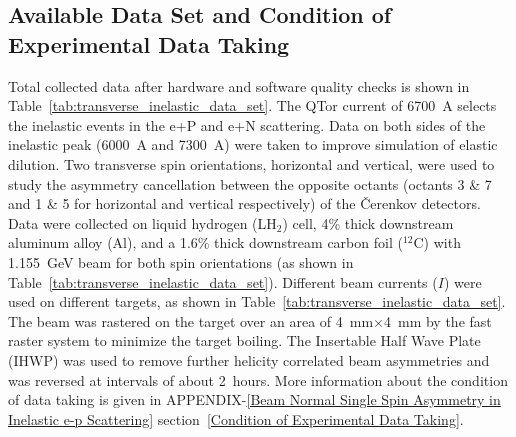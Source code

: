 \subsection{Available Data Set and Condition of Experimental Data Taking}
\label{Available Data Set and Condition of Experimental Data Taking}

Total collected data after hardware and software quality checks is shown in Table~\ref{tab:transverse_inelastic_data_set}. The QTor current of 6700~A selects the inelastic events in the e+P and e+N scattering. Data on both sides of the inelastic peak (6000~A and 7300~A) were taken to improve simulation of elastic dilution. Two transverse spin orientations, horizontal and vertical, were used to study the asymmetry cancellation between the opposite octants (octants 3 \& 7 and 1 \& 5 for horizontal and vertical respectively) of the \v{C}erenkov detectors. Data were collected on liquid hydrogen (LH$_{2}$) cell, 4\% thick downstream aluminum alloy (Al), and a 1.6\% thick downstream carbon foil ($^{12}$C) with 1.155~GeV beam for both spin orientations (as shown in Table~\ref{tab:transverse_inelastic_data_set}). 
Different beam currents ($I$) were used on different targets, as shown in Table~\ref{tab:transverse_inelastic_data_set}.
The beam was rastered on the target over an area of 4~mm$\times$4~mm by the fast raster system to minimize the target boiling.
The Insertable Half Wave Plate (IHWP) was used to remove further helicity correlated beam asymmetries and was reversed at intervals of about 2~hours. 
More information about the condition of data taking is given in APPENDIX-\ref{Beam Normal Single Spin Asymmetry in Inelastic e-p Scattering} section~\ref{Condition of Experimental Data Taking}.


